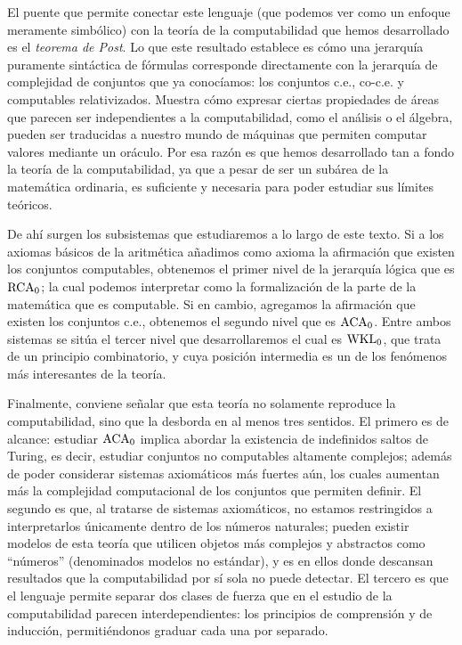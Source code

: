 El puente que permite conectar este lenguaje (que podemos ver como un enfoque meramente simbólico) con la teoría de la computabilidad que hemos desarrollado es el \emph{teorema de Post}. Lo que este resultado establece es cómo una jerarquía puramente sintáctica de fórmulas corresponde directamente con la jerarquía de complejidad de conjuntos que ya conocíamos: los conjuntos c.e., co-c.e. y computables relativizados. Muestra cómo expresar ciertas propiedades de áreas que parecen ser independientes a la computabilidad, como el análisis o el álgebra, pueden ser traducidas a nuestro mundo de máquinas que permiten computar valores mediante un oráculo. Por esa razón es que hemos desarrollado tan a fondo la teoría de la computabilidad, ya que a pesar de ser un subárea de la matemática ordinaria, es suficiente y necesaria para poder estudiar sus límites teóricos.

De ahí surgen los subsistemas que estudiaremos a lo largo de este texto. Si a los axiomas básicos de la aritmética añadimos como axioma la afirmación que existen los conjuntos computables, obtenemos el primer nivel de la jerarquía lógica que es $\mathrm{RCA}_{0}$; la cual podemos interpretar como la formalización de la parte de la matemática que es computable. Si en cambio, agregamos la afirmación que existen los conjuntos c.e., obtenemos el segundo nivel que es $\mathrm{ACA}_{0}$. Entre ambos sistemas se sitúa el tercer nivel que desarrollaremos el cual es $\mathrm{WKL}_{0}$, que trata de un principio combinatorio, y cuya posición intermedia es un de los fenómenos más interesantes de la teoría.

Finalmente, conviene señalar que esta teoría no solamente reproduce la computabilidad, sino que la desborda en al menos tres sentidos. El primero es de alcance: estudiar $\mathrm{ACA}_{0}$ implica abordar la existencia de indefinidos saltos de Turing, es decir, estudiar conjuntos no computables altamente complejos; además de poder considerar sistemas axiomáticos más fuertes aún, los cuales aumentan más la complejidad computacional de los conjuntos que permiten definir. El segundo es que, al tratarse de sistemas axiomáticos, no estamos restringidos a interpretarlos únicamente dentro de los números naturales; pueden existir modelos de esta teoría que utilicen objetos más complejos y abstractos como ``números'' (denominados modelos no estándar), y es en ellos donde descansan resultados que la computabilidad por sí sola no puede detectar. El tercero es que el lenguaje permite separar dos clases de fuerza que en el estudio de la computabilidad parecen interdependientes: los principios de comprensión y de inducción, permitiéndonos graduar cada una por separado.

